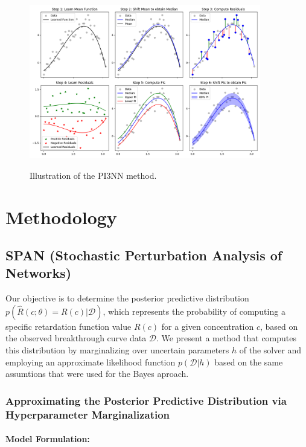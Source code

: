 \documentclass{article}
\begin{document}
\begin{figure}
    \centering
    \includegraphics[width=0.9\textwidth]{figs/3pinn_illustration.png}
    \label{fig:3pinn_illustration}
    \caption{Illustration of the PI3NN method.}
\end{figure}




\section{Methodology}
\subsection{SPAN (Stochastic Perturbation Analysis of Networks)}
Our objective is to determine the posterior predictive distribution $p(\hat{R}(c; \theta) = R(c)| \mathcal{D})$, which represents the probability of computing a specific retardation function value $R(c)$ for a given concentration $c$, based on the observed breakthrough curve data $\mathcal{D}$. We present a method that computes this distribution by marginalizing over uncertain parameters $h$ of the solver and employing an approximate likelihood function $p(\mathcal{D} | h)$ based on the same assumtions that were used for the Bayes aproach.

\subsubsection{Approximating the Posterior Predictive Distribution via Hyperparameter Marginalization}

\paragraph{Model Formulation:}
\end{document}
